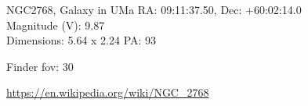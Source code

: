\begin{block}{NGC2768, Galaxy in UMa}
    RA: 09:11:37.50, Dec: +60:02:14.0 \\ 
    Magnitude (V): 9.87 \\ 
    Dimensions: 5.64 x 2.24 PA: 93 

    Finder fov: 30 

    \url{https://en.wikipedia.org/wiki/NGC_2768} 
\end{block}